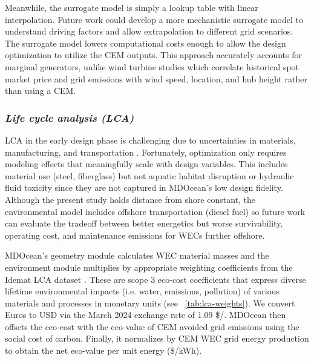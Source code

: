 \documentclass[10pt,twoside]{article}
\begin{document}
Meanwhile, the surrogate model is simply a lookup table with linear interpolation.
Future work could develop a more mechanistic surrogate model to understand driving factors and allow extrapolation to different grid scenarios.
The surrogate model lowers computational costs enough to allow the design optimization to utilize the CEM outputs.
This approach accurately accounts for marginal generators, unlike wind turbine studies \cite{canet_eco-conscious_2023,kainz_how_2024} which correlate historical spot market price and grid emissions with wind speed, location, and hub height rather than using a CEM.


\subsubsection{\textit{Life cycle analysis (LCA)}}
LCA in the early design phase is challenging due to uncertainties in materials, manufacturing, and transportation \cite{moni_life_2020}.
Fortunately, optimization only requires modeling effects that meaningfully scale with design variables.
This includes material use (steel, fiberglass) but not aquatic habitat disruption or hydraulic fluid toxicity since they are not captured in MDOcean's low design fidelity.
Although the present study holds distance from shore constant, the environmental model includes offshore transportation (diesel fuel) so future work can evaluate the tradeoff between better energetics but worse survivability, operating cost, and maintenance emissions for WECs further offshore.

MDOcean's geometry module calculates WEC material masses and the environment module multiplies by appropriate weighting coefficients from the Idemat LCA dataset \cite{van_den_herik_idemat_2024}. These are scope 3 eco-cost coefficients \cite{vogtlander_lca-based_2010} that express diverse lifetime environmental impacts (i.e. water, emissions, pollution) of various materials and processes in monetary units (see \tableautorefname~\ref{tab:lca-weights}).
We convert Euros to USD via the March 2024 exchange rate of 1.09 \$/\texteuro.
MDOcean then offsets the eco-cost with the eco-value of CEM avoided grid emissions using the social cost of carbon. Finally, it normalizes by CEM WEC grid energy production to obtain the net eco-value per unit energy (\$/kWh).
\end{document}

